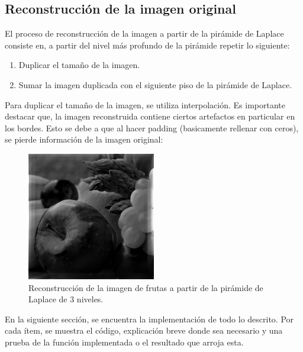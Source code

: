 \documentclass[12pt, letterpaper]{article}
\begin{document}
\subsection{Reconstrucción de la imagen original}
El proceso de reconstrucción de la imagen a partir de la pirámide de Laplace consiste en, a partir del nivel más profundo de la pirámide repetir lo siguiente:
\begin{enumerate}
  \item Duplicar el tamaño de la imagen.
  \item Sumar la imagen duplicada con el siguiente piso de la pirámide de Laplace. 
\end{enumerate}

\par Para duplicar el tamaño de la imagen, se utiliza interpolación. Es importante destacar que, la imagen reconstruida contiene ciertos artefactos en particular en los bordes. Esto se debe a que al hacer padding (basicamente rellenar con ceros), se pierde información de la imagen original: 


\begin{figure}[H]
  \centering
  \includegraphics[width = 0.5\textwidth]{frutas_recons.png}  
  \caption{Reconstrucción de la imagen de frutas a partir de la pirámide de Laplace de 3 niveles.}
  \label{fig:frutasRec}
\end{figure}

\vspace{7cm}
\hrulefill
\par En la siguiente sección, se encuentra la implementación de todo lo descrito.  Por cada ítem, se muestra el código, explicación breve donde sea necesario y una prueba de la función implementada o el resultado que arroja esta. 
 
\end{document}
